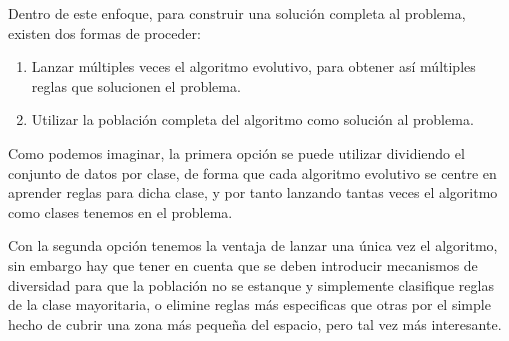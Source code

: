 Dentro de este enfoque, para construir una solución completa al problema, existen dos formas de proceder:

\begin{enumerate}
	\item Lanzar múltiples veces el algoritmo evolutivo, para obtener así múltiples reglas que solucionen el problema.
	\item Utilizar la población completa del algoritmo como solución al problema.
\end{enumerate}

Como podemos imaginar, la primera opción se puede utilizar dividiendo el conjunto de datos por clase, de forma que cada algoritmo evolutivo se centre en aprender reglas para dicha clase, y por tanto lanzando tantas veces el algoritmo como clases tenemos en el problema.

Con la segunda opción tenemos la ventaja de lanzar una única vez el algoritmo, sin embargo hay que tener en cuenta que se deben introducir mecanismos de diversidad para que la población no se estanque y simplemente clasifique reglas de la clase mayoritaria, o elimine reglas más especificas que otras por el simple hecho de cubrir una zona más pequeña del espacio, pero tal vez más interesante.



\newpage
